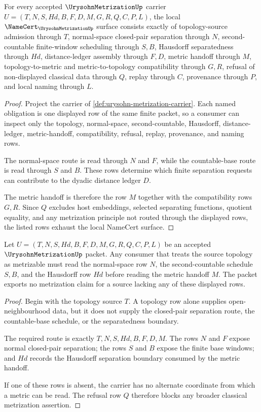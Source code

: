 \begin{theorem}
\label{thm:urysohn-metrization-namecert-obligations}
For every accepted $\UrysohnMetrizationUp$ carrier $U=(T,N,S,Hd,B,F,D,M,G,R,Q,C,P,L)$, the local $\NameCert_{\UrysohnMetrizationUp}$ surface consists exactly of topology-source admission through $T$, normal-space closed-pair separation through $N$, second-countable finite-window scheduling through $S,B$, Hausdorff separatedness through $Hd$, distance-ledger assembly through $F,D$, metric handoff through $M$, topology-to-metric and metric-to-topology compatibility through $G,R$, refusal of non-displayed classical data through $Q$, replay through $C$, provenance through $P$, and local naming through $L$.
\end{theorem}
\begin{proof}
Project the carrier of \autoref{def:urysohn-metrization-carrier}. Each named obligation is one displayed row of the same finite packet, so a consumer can inspect only the topology, normal-space, second-countable, Hausdorff, distance-ledger, metric-handoff, compatibility, refusal, replay, provenance, and naming rows.

The normal-space route is read through $N$ and $F$, while the countable-base route is read through $S$ and $B$. These rows determine which finite separation requests can contribute to the dyadic distance ledger $D$.

The metric handoff is therefore the row $M$ together with the compatibility rows $G,R$. Since $Q$ excludes host embeddings, selected separating functions, quotient equality, and any metrization principle not routed through the displayed rows, the listed rows exhaust the local NameCert surface.
\end{proof}

\begin{theorem}
\label{thm:urysohn-metrization-normal-second-countable-scope}
Let $U=(T,N,S,Hd,B,F,D,M,G,R,Q,C,P,L)$ be an accepted $\UrysohnMetrizationUp$ packet. Any consumer that treats the source topology as metrizable must read the normal-space row $N$, the second-countable schedule $S,B$, and the Hausdorff row $Hd$ before reading the metric handoff $M$. The packet exports no metrization claim for a source lacking any of these displayed rows.
\end{theorem}
\begin{proof}
Begin with the topology source $T$. A topology row alone supplies open-neighbourhood data, but it does not supply the closed-pair separation route, the countable-base schedule, or the separatedness boundary.

The required route is exactly $T,N,S,Hd,B,F,D,M$. The rows $N$ and $F$ expose normal closed-pair separation; the rows $S$ and $B$ expose the finite base windows; and $Hd$ records the Hausdorff separation boundary consumed by the metric handoff.

If one of these rows is absent, the carrier has no alternate coordinate from which a metric can be read. The refusal row $Q$ therefore blocks any broader classical metrization assertion.
\end{proof}

